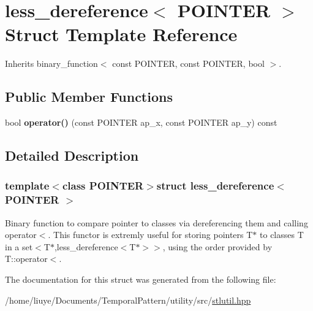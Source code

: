 \hypertarget{structless__dereference}{}\section{less\+\_\+dereference$<$ P\+O\+I\+N\+T\+E\+R $>$ Struct Template Reference}
\label{structless__dereference}


Inherits binary\+\_\+function$<$ const P\+O\+I\+N\+T\+E\+R, const P\+O\+I\+N\+T\+E\+R, bool $>$.

\subsection*{Public Member Functions}
\begin{DoxyCompactItemize}
\item 
\hypertarget{structless__dereference_affd1cdfbd06f5d256a18daa65b7694b9}{}bool {\bfseries operator()} (const P\+O\+I\+N\+T\+E\+R ap\+\_\+x, const P\+O\+I\+N\+T\+E\+R ap\+\_\+y) const \label{structless__dereference_affd1cdfbd06f5d256a18daa65b7694b9}

\end{DoxyCompactItemize}


\subsection{Detailed Description}
\subsubsection*{template$<$class P\+O\+I\+N\+T\+E\+R$>$struct less\+\_\+dereference$<$ P\+O\+I\+N\+T\+E\+R $>$}

Binary function to compare pointer to classes via dereferencing them and calling operator$<$. This functor is extremly useful for storing pointers T$\ast$ to classes T in a set$<$T$\ast$,less\+\_\+dereference$<$\+T$\ast$$>$$>$, using the order provided by T\+::operator$<$. 

The documentation for this struct was generated from the following file\+:\begin{DoxyCompactItemize}
\item 
/home/liuye/\+Documents/\+Temporal\+Pattern/utility/src/\hyperlink{stlutil_8hpp}{stlutil.\+hpp}\end{DoxyCompactItemize}
